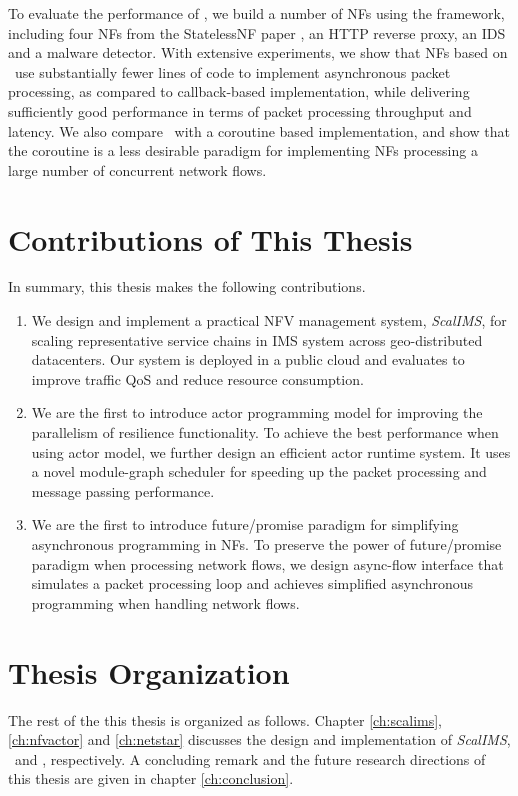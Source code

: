 To evaluate the performance of \netstar, we build a number of NFs using the framework, including four NFs from the StatelessNF paper \cite{201545}, an HTTP reverse proxy, an IDS and a malware detector. %
With extensive experiments, we show that NFs based on \netstar~use substantially fewer lines of code to implement asynchronous packet processing, as compared to callback-based implementation, while delivering sufficiently good performance in terms of packet processing throughput and latency. We also compare \netstar~with a coroutine based implementation, and show that the coroutine is a less desirable paradigm for implementing NFs processing a large number of concurrent network flows.

\section{Contributions of This Thesis}

In summary, this thesis makes the following contributions.

\begin{enumerate}
\item We design and implement a practical NFV management system, \textit{ScalIMS}, for scaling representative service chains in IMS system across geo-distributed datacenters. Our system is deployed in a public cloud and evaluates to improve traffic QoS and reduce resource consumption.
\item We are the first to introduce actor programming model for improving the parallelism of resilience functionality. To achieve the best performance when using actor model, we further design an efficient actor runtime system. It uses a novel module-graph scheduler for speeding up the packet processing and message passing performance.
\item We are the first to introduce future/promise paradigm for simplifying asynchronous programming in NFs. To preserve the power of future/promise paradigm when processing network flows, we design async-flow interface that simulates a packet processing loop and achieves simplified asynchronous programming when handling network flows.
\end{enumerate}

\section{Thesis Organization}

The rest of the this thesis is organized as follows. Chapter \ref{ch:scalims}, \ref{ch:nfvactor} and \ref{ch:netstar} discusses the design and implementation of \textit{ScalIMS}, \nfactor~and \netstar, respectively. A concluding remark and the future research directions of this thesis are given in chapter \ref{ch:conclusion}.
